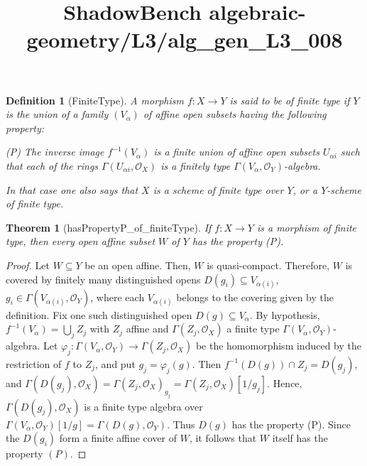 \documentclass{article}
\title{ShadowBench algebraic-geometry/L3/alg\_gen\_L3\_008}
\newtheorem{theorem}{Theorem}
\newtheorem{definition}{Definition}
\begin{document}
\maketitle

\begin{definition}[FiniteType]
A morphism \(f : X \to Y\) is said to be \emph{of finite type} if \(Y\) is the union of a family \((V_\alpha)\) of affine open subsets having the following property:

\medskip

\noindent
(P) The inverse image \(f^{-1}(V_\alpha)\) is a finite union of affine open subsets \(U_{\alpha i}\) such that each of the rings \(\Gamma(U_{\alpha i},\mathcal O_X)\) is a finitely type \(\Gamma(V_\alpha,\mathcal O_Y)\)-algebra.

\medskip

In that case one also says that \(X\) is a scheme of finite type over \(Y\), or a \(Y\)-scheme of finite type.
\end{definition}

\begin{theorem}[hasPropertyP_of_finiteType]
    If \(f:X \to Y \) is a morphism of finite type, then every open affine subset \(W\) of \(Y\) has the property (P).
\end{theorem}
\begin{proof}
Let \(W\subseteq Y\) be an open affine. Then, \(W\) is quasi-compact. Therefore, \(W\) is covered by finitely many distinguished opens \(D(g_i)\subseteq V_{\alpha(i)}\), \( g_i\in \Gamma(V_{\alpha(i)},\mathcal O_Y)\), where each \(V_{\alpha(i)}\) belongs to the covering given by the definition. Fix one such distinguished open \(D(g)\subseteq V_\alpha\). By hypothesis, \(f^{-1}(V_\alpha)=\bigcup_j Z_j\) with \(Z_j\) affine and \(\Gamma(Z_j,\mathcal O_X)\) a finite type \(\Gamma(V_\alpha,\mathcal O_Y)\)-algebra. Let \(\varphi_j:\Gamma(V_\alpha,\mathcal O_Y)\to \Gamma(Z_j,\mathcal O_X)\) be the homomorphism induced by the restriction of \(f\) to \(Z_j\), and put \(g_j=\varphi_j(g)\). Then \(f^{-1}(D(g))\cap Z_j=D(g_j)\), and \(\Gamma(D(g_j),\mathcal O_X) = \Gamma(Z_j,\mathcal O_X)_{g_j} = \Gamma(Z_j,\mathcal O_X)[1/g_j]\). Hence, \(\Gamma(D(g_j),\mathcal O_X)\) is a finite type algebra over \(\Gamma(V_\alpha,\mathcal O_Y)[1/g] = \Gamma(D(g),\mathcal O_Y)\). Thus \(D(g)\) has the property (P). Since the \(D(g_i)\) form a finite affine cover of \(W\), it follows that \(W\) itself has the property \((P)\).
\end{proof}
\end{document}
